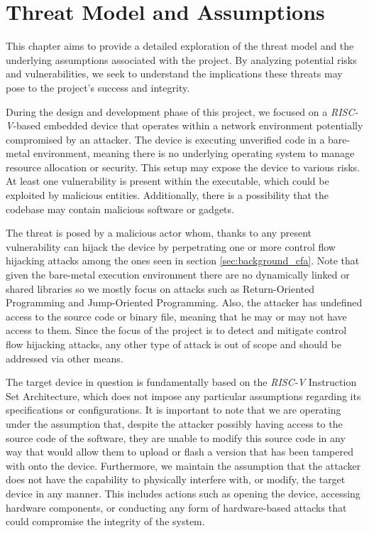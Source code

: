 \chapter{Threat Model and Assumptions}
\label{cha:threatmodel}

This chapter aims to provide a detailed exploration of the threat model and the
underlying assumptions associated with the project. By analyzing potential risks
and vulnerabilities, we seek to understand the implications these threats may
pose to the project's success and integrity.

During the design and development phase of this project, we focused on a \textit{RISC-V}-based
embedded device that operates within a network environment potentially
compromised by an attacker. The device is executing unverified code in a bare-metal
environment, meaning there is no underlying operating system to manage resource
allocation or security. This setup may expose the device to various risks. At
least one vulnerability is present within the executable, which could be exploited
by malicious entities. Additionally, there is a possibility that the codebase may
contain malicious software or gadgets.

The threat is posed by a malicious actor whom, thanks to any present
vulnerability can hijack the device by perpetrating one or more control flow
hijacking attacks among the ones seen in section \ref{sec:background_cfa}. Note that
given the bare-metal execution environment there are no dynamically linked or shared
libraries so we mostly focus on attacks such as Return-Oriented Programming and Jump-Oriented
Programming. Also, the attacker has undefined access to the source code or binary
file, meaning that he may or may not have access to them. Since the focus of the
project is to detect and mitigate control flow hijacking attacks, any other type
of attack is out of scope and should be addressed via other means.

The target device in question is fundamentally based on the \textit{RISC-V} Instruction
Set Architecture, which does not impose any particular assumptions regarding its
specifications or configurations. It is important to note that we are operating under
the assumption that, despite the attacker possibly having access to the source
code of the software, they are unable to modify this source code in any way that
would allow them to upload or flash a version that has been tampered with onto the
device. Furthermore, we maintain the assumption that the attacker does not have the
capability to physically interfere with, or modify, the target device in any manner.
This includes actions such as opening the device, accessing hardware components,
or conducting any form of hardware-based attacks that could compromise the
integrity of the system.
